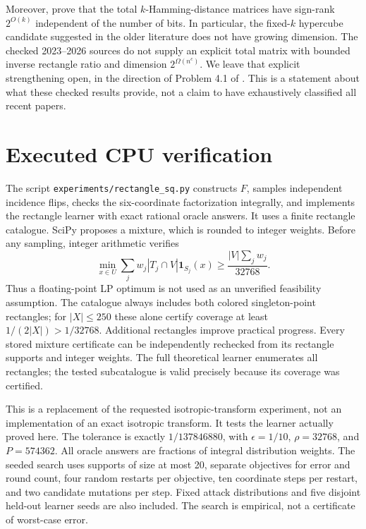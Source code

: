 \documentclass[11pt]{article}
\newcommand{\1}{\mathbf 1}
\begin{document}
Moreover, \citet{GHIS25} prove that the total $k$-Hamming-distance matrices have sign-rank $2^{O(k)}$ independent of the number of bits. In particular, the fixed-$k$ hypercube candidate suggested in the older literature does not have growing dimension. The checked 2023--2026 sources do not supply an explicit total matrix with bounded inverse rectangle ratio and dimension $2^{\Omega(n^c)}$. We leave that explicit strengthening open, in the direction of Problem 4.1 of \citet{HHPTZ22}. This is a statement about what these checked results provide, not a claim to have exhaustively classified all recent papers.

\section{Executed CPU verification}
The script \texttt{experiments/rectangle\_sq.py} constructs $F$, samples independent incidence flips, checks the six-coordinate factorization integrally, and implements the rectangle learner with exact rational oracle answers. It uses a finite rectangle catalogue. SciPy proposes a mixture, which is rounded to integer weights. Before any sampling, integer arithmetic verifies
\[
 \min_{x\in U}\sum_j w_j|T_j\cap V|\1_{S_j}(x)
 \ge\frac{|V|\sum_jw_j}{32768}.
\]
Thus a floating-point LP optimum is not used as an unverified feasibility assumption. The catalogue always includes both colored singleton-point rectangles; for $|X|\le250$ these alone certify coverage at least $1/(2|X|)>1/32768$. Additional rectangles improve practical progress. Every stored mixture certificate can be independently rechecked from its rectangle supports and integer weights. The full theoretical learner enumerates all rectangles; the tested subcatalogue is valid precisely because its coverage was certified.

This is a replacement of the requested isotropic-transform experiment, not an implementation of an exact isotropic transform. It tests the learner actually proved here. The tolerance is exactly $1/137846880$, with $\epsilon=1/10$, $\rho=32768$, and $P=574362$. All oracle answers are fractions of integral distribution weights. The seeded search uses supports of size at most 20, separate objectives for error and round count, four random restarts per objective, ten coordinate steps per restart, and two candidate mutations per step. Fixed attack distributions and five disjoint held-out learner seeds are also included. The search is empirical, not a certificate of worst-case error.
\end{document}
